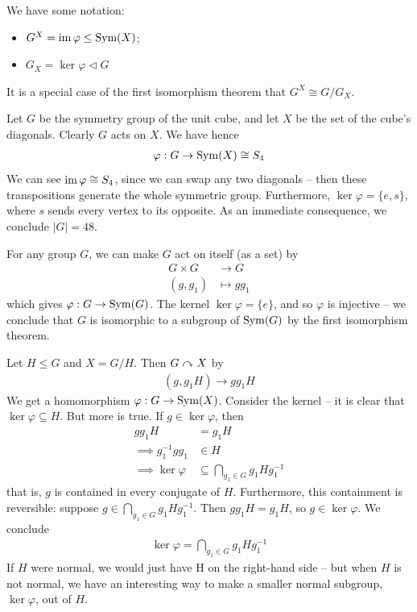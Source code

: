 \documentclass{../template/note}
\begin{document}
    We have some notation:
    \begin{itemize}
        \item $G^X = \operatorname{im} \varphi \leq \operatorname{Sym}(X)$;
        \item $G_X = \ker \varphi \triangleleft G$
    \end{itemize}
    It is a special case of the first isomorphism theorem that $G^X \cong G/G_X$.
    
    \begin{example}
        Let $G$ be the symmetry group of the unit cube, and let $X$ be the set of the cube's diagonals. Clearly $G$ acts on $X$. We have hence
        \begin{align*}
            \varphi: G \to \operatorname{Sym}(X) \cong S_4
        \end{align*}
        We can see $\operatorname{im} \varphi \cong S_4$, since we can swap any two diagonals -- then these transpositions generate the whole symmetric group. Furthermore, $\ker \varphi = \{e, s\}$, where $s$ sends every vertex to its opposite. As an immediate consequence, we conclude $|G| = 48$.
    \end{example}
    
    \begin{example}
        For any group $G$, we can make $G$ act on itself (as a set) by
        \begin{align*}
            G \times G &\to G \\
            (g, g_1) &\mapsto gg_1
        \end{align*}
        which gives $\varphi: G \to \operatorname{Sym}(G)$. The kernel $\ker \varphi = \{e\}$, and so $\varphi$ is injective -- we conclude that $G$ is isomorphic to a subgroup of $\operatorname{Sym}(G)$ by the first isomorphism theorem.
    \end{example}
    
    \begin{example}
        Let $H \leq G$ and $X = G/H$. Then $G \curvearrowright X$ by
        \begin{align*}
            (g, g_1H) \to gg_1H
        \end{align*}
        We get a homomorphism $\varphi: G \to \operatorname{Sym}(X)$. Consider the kernel -- it is clear that $\ker \varphi \subseteq H$. But more is true. If $g \in \ker \varphi$, then
        \begin{align*}
            gg_1H &= g_1H \\
            \implies g_1^{-1}gg_1 &\in H \\
            \implies \ker \varphi &\subseteq \bigcap_{g_1 \in G}g_1Hg_1^{-1}
        \end{align*}
        that is, $g$ is contained in every conjugate of $H$. Furthermore, this containment is reversible: suppose $g \in \bigcap_{g_1 \in G} g_1Hg_1^{-1}$. Then $gg_1H = g_1H$, so $g \in \ker \varphi$. We conclude
        \begin{align*}
            \ker \varphi = \bigcap_{g_1 \in G} g_1Hg_1^{-1}
        \end{align*}
        If $H$ were normal, we would just have H on the right-hand side -- but when $H$ is not normal, we have an interesting way to make a smaller normal subgroup, $\ker \varphi$, out of $H$.
    \end{example}
    
\end{document}
